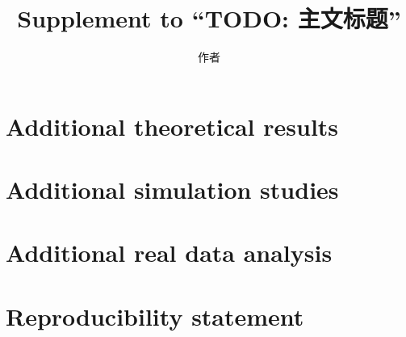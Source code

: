 \documentclass[11pt]{article}
\title{Supplement to ``TODO: 主文标题''}
\author{作者}
\date{}
\begin{document}
\maketitle

\tableofcontents

\section{Additional theoretical results}

\section{Additional simulation studies}

\section{Additional real data analysis}

\section{Reproducibility statement}



\end{document}
